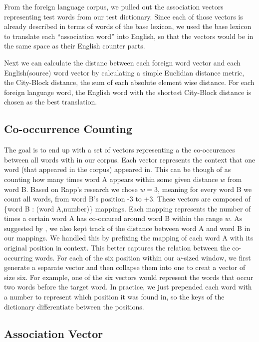 \documentclass[12pt]{article}
\begin{document}

From the foreign language corpus, we pulled out the association vectors representing test words from our test dictionary. Since each of those vectors is already described in terms of words of the base lexicon, we used the base lexicon to translate each ``association word'' into English, so that the vectors would be in the same space as their English counter parts.

Next we can calculate the distanc between each foreign word vector and each English(source) word vector by calculating a simple Euclidian distance metric, the City-Block distance, the sum of each absolute element wise distance. For each foreign language word, the English word with the shortest City-Block distance is chosen as the best translation.

\subsection{Co-occurrence Counting}

The goal is to end up with a set of vectors representing a the co-occurences between all words with in our corpus. Each vector
represents the context that one word (that appeared in the corpus) appeared in. This can be though of as counting how many times word A appears within some given distance $w$ from word B. Based on Rapp's research we chose $w=3$, meaning for every word B we count all words, from word B's position -3 to +3. These vectors are composed of \{word B : (word A,number)\} mappings. Each mapping represents the number of times a certain word A has co-occured around word B within the range $w$. As suggested by \cite{rapp1999automatic}, we also kept track of the distance between word A and word B in our mappings. We handled this by prefixing the mapping of each word A with its original position in context. This better captures the relation between the co-occurring words. For each of the six position within our $w$-sized window, we first generate a separate vector and then collapse them into one to creat a vector of size six. For example, one of the six vectors would represent the words that
occur two words before the target word. In practice, we just prepended each word with a number to represent which position it was found in, so the keys of the dictionary differentiate between the positions.

\subsection{Association Vector}
\end{document}
